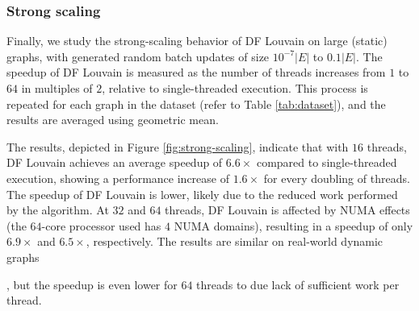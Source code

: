 



\subsubsection{Strong scaling}
\label{sec:strong-scaling}

Finally, we study the strong-scaling behavior of DF Louvain on large (static) graphs, with generated random batch updates of size $10^{-7}|E|$ to $0.1|E|$. The speedup of DF Louvain is measured as the number of threads increases from $1$ to $64$ in multiples of $2$, relative to single-threaded execution. This process is repeated for each graph in the dataset (refer to Table \ref{tab:dataset}), and the results are averaged using geometric mean.

The results, depicted in Figure \ref{fig:strong-scaling}, indicate that with $16$ threads, DF Louvain achieves an average speedup of $6.6\times$ compared to single-threaded execution, showing a performance increase of $1.6\times$ for every doubling of threads. The speedup of DF Louvain is lower, likely due to the reduced work performed by the algorithm. At $32$ and $64$ threads, DF Louvain is affected by NUMA effects (the $64$-core processor used has $4$ NUMA domains), resulting in a speedup of only $6.9\times$ and $6.5\times$, respectively. The results are similar on real-world dynamic graphs, but the speedup is even lower for $64$ threads to due lack of sufficient work per thread.
